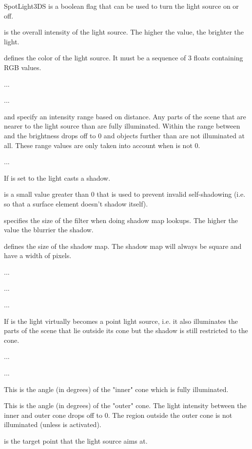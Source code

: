 \begin{classdesc}{SpotLight3DS}
 is a boolean flag that can be used to turn the light source
on or off.

 is the overall intensity of the light source. The higher
the value, the brighter the light.

 defines the color of the light source. It must be a sequence
of 3 floats containing RGB values.

 ...

 ...

 and  specify an intensity range based
on distance. Any parts of the scene that are nearer to the light source
than  are fully illuminated. Within the range between
 and  the brightness drops off to 0
and objects further than  are not illuminated at all.
These range values are only taken into account when 
is not 0.

 ...

If  is set to  the light casts a shadow.

 is a small value greater than 0 that is used to prevent
invalid self-shadowing (i.e. so that a surface element doesn't shadow itself).

 specifies the size of the filter when doing shadow map
lookups. The higher the value the blurrier the shadow.

 defines the size of the shadow map. The shadow map will
always be square and have a width of  pixels.

 ...

 ...

 ...

If  is  the light virtually becomes a point light
source, i.e. it also illuminates the parts of the scene that lie outside
its cone but the shadow is still restricted to the cone.

 ...

 ...

 This is the angle (in degrees) of the "inner" cone which is fully illuminated.

 This is the angle (in degrees) of the "outer" cone. The light 
intensity between the inner and outer cone drops off to 0. The region outside
the outer cone is not illuminated (unless  is activated).

 is the target point that the light source aims at.

\end{classdesc}

